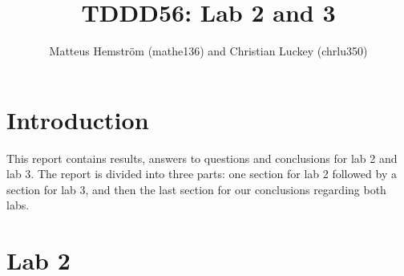 \documentclass[a4paper,12pt]{article}
\title{TDDD56: Lab 2 and 3}
\author{Matteus Hemström (mathe136) and Christian Luckey (chrlu350)}
\begin{document}
\maketitle

\section{Introduction}
This report contains results, answers to questions and conclusions for lab 2 and lab 3. The report is divided into three parts: one section for lab 2 followed by a section for lab 3, and then the last section for our conclusions regarding both labs.

\section{Lab 2}
\end{document}
